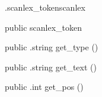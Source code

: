 \begin{CrexxClass}{.scanlex\_token}{scanlex}

  \begin{Hierarchy}
  \end{Hierarchy}

  \begin{Members}

    \Factory
      {public}
      {scanlex\_token}
      {}

    \Method
      {public}
      {.string}
      {get\_type}
      {()}

    \Method
      {public}
      {.string}
      {get\_text}
      {()}

    \Method
      {public}
      {.int}
      {get\_pos}
      {()}

  \end{Members}
\end{CrexxClass}


